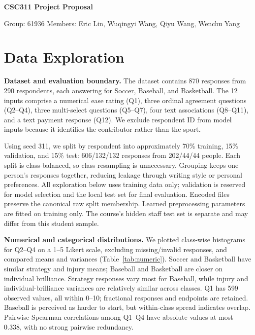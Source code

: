 \documentclass[10pt,letterpaper]{article}
\newcommand{\topic}[1]{\par\smallskip\textbf{#1}\quad}
\begin{document}
\begin{center}
{\Large\bfseries CSC311 Project Proposal}\par
{\small Group: 61936 \quad Members: Eric Lin, Wuqingyi Wang, Qiyu Wang, Wenchu Yang}\par
\end{center}
\vspace{-1em}
\section{Data Exploration}
\topic{Dataset and evaluation boundary.}
The dataset contains 870 responses from 290 respondents, each answering for
Soccer, Baseball, and Basketball. The 12 inputs comprise a numerical ease rating
(Q1), three ordinal agreement questions (Q2--Q4), three multi-select questions
(Q5--Q7), four text associations (Q8--Q11), and a text payment response (Q12).
We exclude respondent ID from model inputs because it identifies the contributor
rather than the sport.

Using seed 311, we split by respondent into approximately 70\% training,
15\% validation, and 15\% test: 606/132/132 responses from 202/44/44 people.
Each split is class-balanced, so class resampling is unnecessary. Grouping keeps
one person's responses together, reducing leakage through writing style or
personal preferences. All exploration below uses training data only; validation
is reserved for model selection and the local test set for final evaluation.
Encoded files preserve the canonical raw split membership. Learned preprocessing
parameters are fitted on training only. The course's hidden staff test set is
separate and may differ from this student sample.

\topic{Numerical and categorical distributions.}
We plotted class-wise histograms for Q2--Q4 on a 1--5 Likert scale, excluding
missing/invalid responses, and compared means and variances (Table~\ref{tab:numeric}).
Soccer and Basketball have similar strategy and injury means; Baseball and
Basketball are closer on individual brilliance. Strategy responses vary most
for Baseball, while injury and individual-brilliance variances are relatively
similar across classes. Q1 has 599 observed values, all within 0--10; fractional
responses and endpoints are retained. Baseball is perceived as harder to start,
but within-class spread indicates overlap. Pairwise Spearman correlations among
Q1--Q4 have absolute values at most 0.338, with no strong pairwise redundancy.
\end{document}
